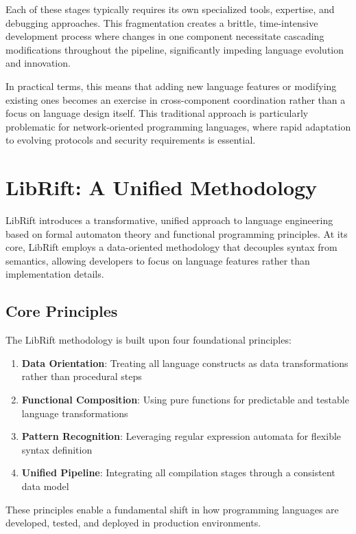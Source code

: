 \documentclass{article}
\begin{document}
Each of these stages typically requires its own specialized tools, expertise, and debugging approaches. This fragmentation creates a brittle, time-intensive development process where changes in one component necessitate cascading modifications throughout the pipeline, significantly impeding language evolution and innovation.

In practical terms, this means that adding new language features or modifying existing ones becomes an exercise in cross-component coordination rather than a focus on language design itself. This traditional approach is particularly problematic for network-oriented programming languages, where rapid adaptation to evolving protocols and security requirements is essential.

\section{LibRift: A Unified Methodology}

LibRift introduces a transformative, unified approach to language engineering based on formal automaton theory and functional programming principles. At its core, LibRift employs a data-oriented methodology that decouples syntax from semantics, allowing developers to focus on language features rather than implementation details.

\subsection{Core Principles}

The LibRift methodology is built upon four foundational principles:

\begin{enumerate}
    \item \textbf{Data Orientation}: Treating all language constructs as data transformations rather than procedural steps
    \item \textbf{Functional Composition}: Using pure functions for predictable and testable language transformations
    \item \textbf{Pattern Recognition}: Leveraging regular expression automata for flexible syntax definition
    \item \textbf{Unified Pipeline}: Integrating all compilation stages through a consistent data model
\end{enumerate}

These principles enable a fundamental shift in how programming languages are developed, tested, and deployed in production environments.
\end{document}

